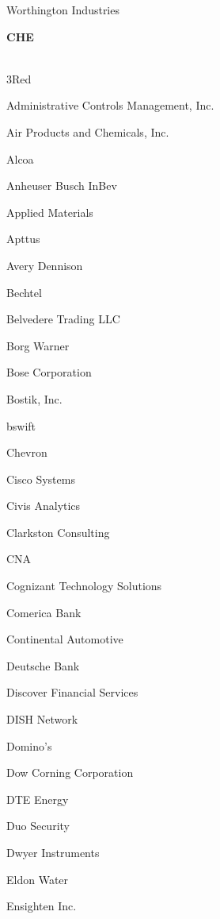 \documentclass[twoside]{article}
\begin{document}
\begin{center}
\begin{multicols}{5}
\begin{FlushLeft}
\begin{compactitem}
\item Worthington Industries
\end{compactitem}
        \end{FlushLeft}
        \vspace{1em}
        {\fontsize{14}{16}\selectfont \bf CHE}\\
        \vspace{-1em}
        ~\hrulefill~
        \vspace{-.9em}
        \begin{FlushLeft}
        \begin{compactitem}
        \item 3Red
\item Administrative Controls Management, Inc.
\item Air Products and Chemicals, Inc.
\item Alcoa
\item Anheuser Busch InBev
\item Applied Materials
\item Apttus
\item Avery Dennison
\item Bechtel
\item Belvedere Trading LLC
\item Borg Warner
\item Bose Corporation
\item Bostik, Inc.
\item bswift
\item Chevron
\item Cisco Systems
\item Civis Analytics
\item Clarkston Consulting
\item CNA
\item Cognizant Technology Solutions
\item Comerica Bank
\item Continental Automotive
\item Deutsche Bank
\item Discover Financial Services
\item DISH Network
\item Domino's
\item Dow Corning Corporation
\item DTE Energy
\item Duo Security
\item Dwyer Instruments
\item Eldon Water
\item Ensighten Inc.

\end{compactitem}
\end{FlushLeft}
\end{multicols}
\end{center}
\end{document}
